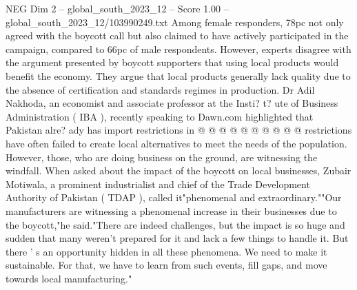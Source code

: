 \begin{textsample}{NEG Dim 2 – global\_south\_2023\_12 – Score 1.00 – global\_south\_2023\_12/103990249.txt}
Among female responders, 78pc not only agreed with the boycott call but also claimed to have actively participated in the campaign, compared to 66pc of male respondents.
However, experts disagree with the argument presented by boycott supporters that using local products would benefit the economy.
They argue that local products generally lack quality due to the absence of certification and standards regimes in production.
Dr Adil Nakhoda, an economist and associate professor at the Insti? t? ute of Business Administration ( IBA ), recently speaking to Dawn.com highlighted that Pakistan alre? ady has import restrictions in @ @ @ @ @ @ @ @ @ @ restrictions have often failed to create local alternatives to meet the needs of the population.
However, those, who are doing business on the ground, are witnessing the windfall.
When asked about the impact of the boycott on local businesses, Zubair Motiwala, a prominent industrialist and chief of the Trade Development Authority of Pakistan ( TDAP ), called it"phenomenal and extraordinary.""Our manufacturers are witnessing a phenomenal increase in their businesses due to the boycott,"he said."There are indeed challenges, but the impact is so huge and sudden that many weren't prepared for it and lack a few things to handle it.
But there ' s an opportunity hidden in all these phenomena.
We need to make it sustainable.
For that, we have to learn from such events, fill gaps, and move towards local manufacturing."

\end{textsample}
